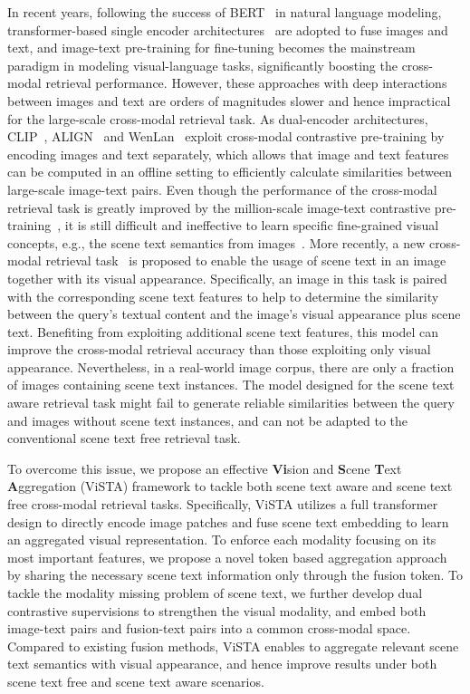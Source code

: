 \documentclass[10pt,twocolumn,letterpaper]{article}
\begin{document}
\vspace{-0.08em}
In recent years, following the success of BERT~\cite{BERT} in natural language modeling, transformer-based single encoder architectures~\cite{vilbert, imagebert, unicoder, UNITER, oscar, ERNIE-ViL, vinvl, Pixel-BERT, SOHO, ViLT, xue2021probing} are adopted to fuse images and text, and image-text pre-training for fine-tuning becomes the mainstream paradigm in modeling visual-language tasks, significantly boosting the cross-modal retrieval performance. However, these approaches with deep interactions between images and text are orders of magnitudes slower and hence impractical for the large-scale cross-modal retrieval task. As dual-encoder architectures, CLIP~\cite{CLIP}, ALIGN~\cite{ALIGN} and WenLan~\cite{wenlan} exploit cross-modal contrastive pre-training by encoding images and text separately, which allows that image and text features can be computed in an offline setting to efficiently calculate similarities between large-scale image-text pairs. Even though the performance of the cross-modal retrieval task is greatly improved by the million-scale image-text contrastive pre-training~\cite{CLIP}, it is still difficult and ineffective to learn specific fine-grained visual concepts, e.g., the scene text semantics from images~\cite{CLIP}. 
More recently, a new cross-modal retrieval task~\cite{STARNet} is proposed to enable the usage of scene text in an image together with its visual appearance. Specifically, an image in this task is paired with the corresponding scene text features to help to determine the similarity between the query's textual content and the image's visual appearance plus scene text. Benefiting from exploiting additional scene text features, this model can improve the cross-modal retrieval accuracy than those exploiting only visual appearance. Nevertheless, in a real-world image corpus, there are only a fraction of images containing scene text instances. 
The model designed for the scene text aware retrieval task might fail to generate reliable similarities between the query and images without scene text instances, and can not be adapted to the conventional scene text free retrieval task.

\vspace{-0.23em} 
To overcome this issue, we propose an effective \textbf{Vi}sion and \textbf{S}cene \textbf{T}ext \textbf{A}ggregation (ViSTA) framework to tackle both scene text aware and scene text free cross-modal retrieval tasks. Specifically, ViSTA utilizes a full transformer design to directly encode image patches and fuse scene text embedding to learn an aggregated visual representation. To enforce each modality focusing on its most important features, we propose a novel token based aggregation approach by sharing the necessary scene text information only through the fusion token. To tackle the modality missing problem of scene text, we further develop dual contrastive supervisions to strengthen the visual modality, and embed both image-text pairs and fusion-text pairs into a common cross-modal space. Compared to existing fusion methods, ViSTA enables to aggregate relevant scene text semantics with visual appearance, and hence improve results under both scene text free and scene text aware scenarios. 
\end{document}
